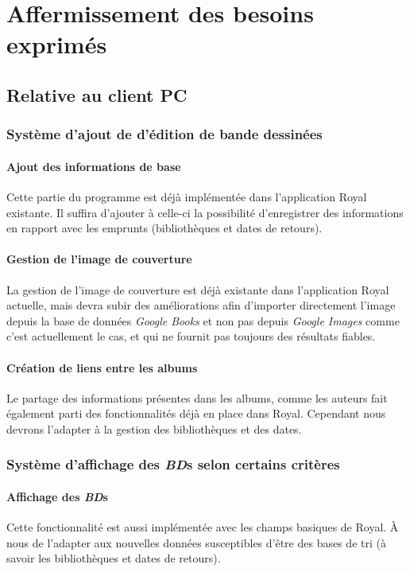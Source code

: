 \section{Affermissement des besoins exprimés} 

\subsection{Relative au client PC}
\subsubsection{Système d'ajout de d'édition de bande dessinées}

\paragraph{Ajout des informations de base}
Cette partie du programme est déjà implémentée dans l'application Royal existante. 
Il suffira d'ajouter à celle-ci la possibilité d'enregistrer des informations en rapport avec les emprunts (bibliothèques et dates de retours). 

\paragraph{Gestion de l'image de couverture}
La gestion de l'image de couverture est déjà existante dans l'application Royal actuelle,
	mais devra subir des améliorations afin d'importer directement l'image depuis la base de données \emph{Google Books} et non pas depuis \emph{Google Images} comme c'est actuellement le cas,
	et qui ne fournit pas toujours des résultats fiables.

\paragraph{Création de liens entre les albums}	
Le partage des informations présentes dans les albums, comme les auteurs fait également parti des fonctionnalités déjà en place dans Royal. 
Cependant nous devrons l'adapter à la gestion des bibliothèques et des dates. 

\subsubsection{Système d'affichage des \emph{BD}s selon certains critères}

\paragraph{Affichage des \emph{BD}s}
Cette fonctionnalité est aussi implémentée avec les champs basiques de Royal.
À nous de l'adapter aux nouvelles données susceptibles d'être des bases de tri 
(à savoir les bibliothèques et dates de retours). 

